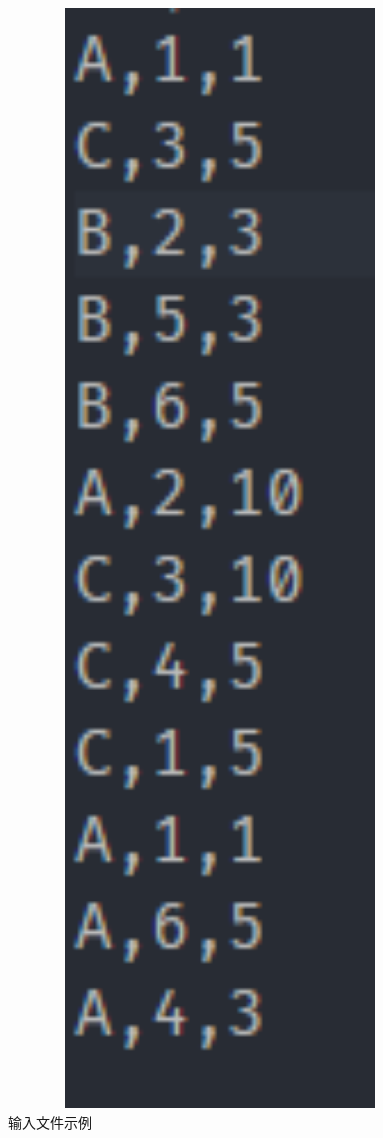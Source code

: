 \documentclass[forprint]{myreport}
\begin{document}
\begin{multicols}{2}
\begin{figure}[htp]
      \includegraphics[width=13cm]{figure/2018-07-04-10-30-07.png}
      \caption{输入文件示例}
      \label{fig:example-input}
    \end{figure}
    

\end{multicols}
\end{document}

